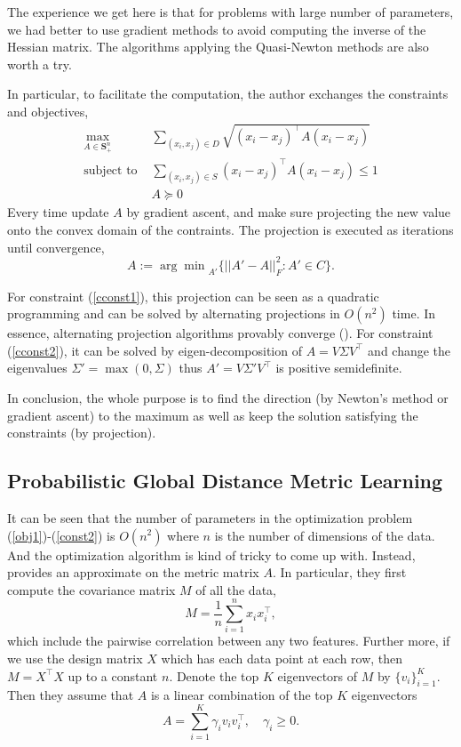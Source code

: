 \documentclass[12pt]{article}
\newcommand\SM{\mathbf{S}}
\newcommand\T{^\top}
\newcommand{\st}{\text{subject to }}
\begin{document}
The experience we get here is that for problems with large number of parameters, we had better to use gradient methods to avoid computing the inverse of the Hessian matrix. The algorithms applying the Quasi-Newton methods are also worth a try.

In particular, to facilitate the computation, the author exchanges the constraints and objectives,
\begin{align}
\max_{A\in\SM_+^n} & \sum_{(x_i,x_j)\in D} \sqrt{(x_i-x_j)\T A(x_i-x_j)}\\
\st &   \sum_{(x_i,x_j)\in S} (x_i-x_j)\T A(x_i-x_j)\leq 1 \label{cconst1}\\
& A\succeq 0\label{cconst2}
\end{align}
Every time update $A$ by gradient ascent, and make sure projecting the new value onto the convex domain of the contraints. The projection is executed as iterations until convergence,
\[A := {\arg\min}_{A'}\{||A'-A||_F^2: A'\in C\}.\]

For constraint (\ref{cconst1}), this projection can be seen as a quadratic programming and can be solved by alternating projections in $O(n^2)$ time. In essence, alternating projection algorithms provably converge (\citet{vandenberghe1996semidefinite}). For constraint (\ref{cconst2}), it can be solved by eigen-decomposition of $A = V\Sigma V\T$ and change the eigenvalues $\Sigma'=\max(0,\Sigma)$ thus $A'=V\Sigma' V\T$ is positive semidefinite.

In conclusion, the whole purpose is to find the direction (by Newton's method or gradient ascent) to the maximum as well as keep the solution satisfying the constraints (by projection).

\subsection{Probabilistic Global Distance Metric Learning}

It can be seen that the number of parameters in the optimization problem (\ref{obj1})-(\ref{const2}) is $O(n^2)$ where $n$ is the number of dimensions of the data. And the optimization algorithm is kind of tricky to come up with. Instead, \citet{yang2006distance} provides an approximate on the metric matrix $A$. In particular, they first compute the covariance matrix $M$ of all the data, 
\[M = \frac{1}{n}\sum_{i=1}^{n}x_ix_i\T,\]
which include the pairwise correlation between any two features. Further more, if we use the design matrix $X$ which has each data point at each row, then $M=X\T X$ up to a constant $n$. Denote the top $K$ eigenvectors of $M$ by $\{v_i\}_{i=1}^K$. Then they assume that $A$ is a linear combination of the top $K$ eigenvectors
\[A=\sum_{i=1}^{K} \gamma_iv_iv_i\T,\quad \gamma_i\geq0.\]
\end{document}
